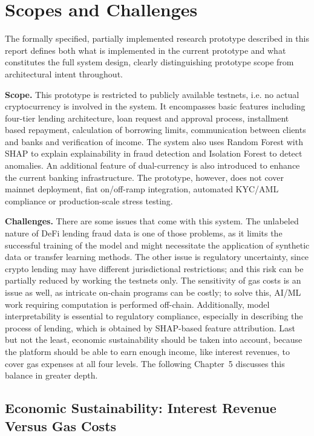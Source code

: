 \documentclass[12pt,a4paper]{report}
\begin{document}
\section{Scopes and Challenges}

\noindent The formally specified, partially implemented research prototype described in this report defines both what is implemented in the current prototype and what constitutes the full system design, clearly distinguishing prototype scope from architectural intent throughout.

\textbf{Scope.} This prototype is restricted to publicly available testnets, i.e. no actual cryptocurrency is involved in the system. It encompasses basic features including four-tier lending architecture, loan request and approval process, installment based repayment, calculation of borrowing limits, communication between clients and banks and verification of income. The system also uses Random Forest with SHAP to explain explainability in fraud detection and Isolation Forest to detect anomalies. An additional feature of dual-currency is also introduced to enhance the current banking infrastructure. The prototype, however, does not cover mainnet deployment, fiat on/off-ramp integration, automated KYC/AML compliance or production-scale stress testing.

\textbf{Challenges.} There are some issues that come with this system. The unlabeled nature of DeFi lending fraud data is one of those problems, as it limits the successful training of the model and might necessitate the application of synthetic data or transfer learning methods. The other issue is regulatory uncertainty, since crypto lending may have different jurisdictional restrictions; and this risk can be partially reduced by working the testnets only. The sensitivity of gas costs is an issue as well, as intricate on-chain programs can be costly; to solve this, AI/ML work requiring computation is performed off-chain. Additionally, model interpretability is essential to regulatory compliance, especially in describing the process of lending, which is obtained by SHAP-based feature attribution. Last but not the least, economic sustainability should be taken into account, because the platform should be able to earn enough income, like interest revenues, to cover gas expenses at all four levels. The following Chapter~5 discusses this balance in greater depth.

\subsection{Economic Sustainability: Interest Revenue Versus Gas Costs}
\end{document}
